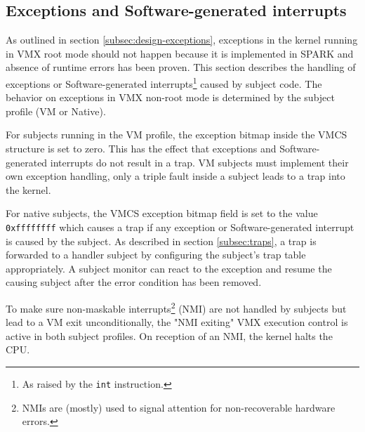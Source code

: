\subsection{Exceptions and Software-generated interrupts}
As outlined in section \ref{subsec:design-exceptions}, exceptions in the kernel
running in VMX root mode should not happen because it is implemented in SPARK
and absence of runtime errors has been proven.  This section describes the
handling of exceptions or Software-generated interrupts\footnote{As raised by
the \texttt{int} instruction.} caused by subject code. The behavior on
exceptions in VMX non-root mode is determined by the subject profile (VM or
Native).

For subjects running in the VM profile, the exception bitmap inside the VMCS
structure is set to zero. This has the effect that exceptions and
Software-generated interrupts do not result in a trap. VM subjects must
implement their own exception handling, only a triple fault inside a subject
leads to a trap into the kernel.

For native subjects, the VMCS exception bitmap field is set to the value
\texttt{0xffffffff} which causes a trap if any exception or Software-generated
interrupt is caused by the subject. As described in section \ref{subsec:traps},
a trap is forwarded to a handler subject by configuring the subject's trap
table appropriately. A subject monitor can react to the exception and resume
the causing subject after the error condition has been removed.

To make sure non-maskable interrupts\footnote{NMIs are (mostly) used to signal
attention for non-recoverable hardware errors.} (NMI) are not
handled by subjects but lead to a VM exit unconditionally, the "NMI exiting"
VMX execution control is active in both subject profiles. On reception of an
NMI, the kernel halts the CPU.
